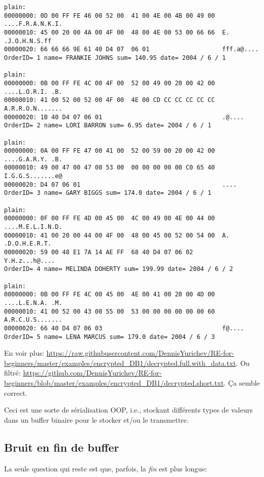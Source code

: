 \begin{lstlisting}
plain:
00000000: 0D 00 FF FE 46 00 52 00  41 00 4E 00 4B 00 49 00  ....F.R.A.N.K.I.
00000010: 45 00 20 00 4A 00 4F 00  48 00 4E 00 53 00 66 66  E. .J.O.H.N.S.ff
00000020: 66 66 66 9E 61 40 D4 07  06 01                    fff.a@....
OrderID= 1 name= FRANKIE JOHNS sum= 140.95 date= 2004 / 6 / 1

plain:
00000000: 0B 00 FF FE 4C 00 4F 00  52 00 49 00 20 00 42 00  ....L.O.R.I. .B.
00000010: 41 00 52 00 52 00 4F 00  4E 00 CD CC CC CC CC CC  A.R.R.O.N.......
00000020: 1B 40 D4 07 06 01                                 .@....
OrderID= 2 name= LORI BARRON sum= 6.95 date= 2004 / 6 / 1

plain:
00000000: 0A 00 FF FE 47 00 41 00  52 00 59 00 20 00 42 00  ....G.A.R.Y. .B.
00000010: 49 00 47 00 47 00 53 00  00 00 00 00 00 C0 65 40  I.G.G.S.......e@
00000020: D4 07 06 01                                       ....
OrderID= 3 name= GARY BIGGS sum= 174.0 date= 2004 / 6 / 1

plain:
00000000: 0F 00 FF FE 4D 00 45 00  4C 00 49 00 4E 00 44 00  ....M.E.L.I.N.D.
00000010: 41 00 20 00 44 00 4F 00  48 00 45 00 52 00 54 00  A. .D.O.H.E.R.T.
00000020: 59 00 48 E1 7A 14 AE FF  68 40 D4 07 06 02        Y.H.z...h@....
OrderID= 4 name= MELINDA DOHERTY sum= 199.99 date= 2004 / 6 / 2

plain:
00000000: 0B 00 FF FE 4C 00 45 00  4E 00 41 00 20 00 4D 00  ....L.E.N.A. .M.
00000010: 41 00 52 00 43 00 55 00  53 00 00 00 00 00 00 60  A.R.C.U.S.......
00000020: 66 40 D4 07 06 03                                 f@....
OrderID= 5 name= LENA MARCUS sum= 179.0 date= 2004 / 6 / 3
\end{lstlisting}

En voir plus: \url{https://raw.githubusercontent.com/DennisYurichev/RE-for-beginners/master/examples/encrypted_DB1/decrypted.full.with_data.txt}.
Ou filtré: \url{https://github.com/DennisYurichev/RE-for-beginners/blob/master/examples/encrypted_DB1/decrypted.short.txt}.
Ça semble correct.

Ceci est une sorte de sérialisation \ac{OOP}, i.e., stockant différents types de
valeurs dans un buffer binaire pour le stocker et/ou le transmettre.

\subsection{Bruit en fin de buffer}

La seule question qui reste est que, parfois, la \emph{fin} est plus longue:

